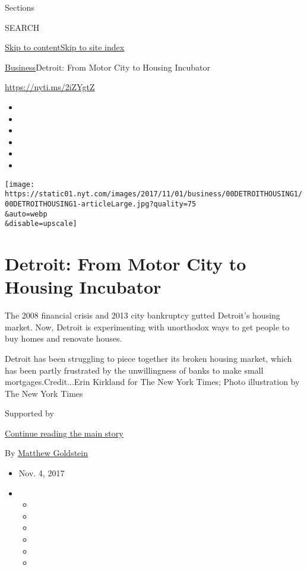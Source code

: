 Sections

SEARCH

\protect\hyperlink{site-content}{Skip to
content}\protect\hyperlink{site-index}{Skip to site index}

\href{/section/business}{Business}\textbar{}Detroit: From Motor City to
Housing Incubator

\url{https://nyti.ms/2iZYgtZ}

\begin{itemize}
\item
\item
\item
\item
\item
\item
\end{itemize}

\texttt{[image: https://static01.nyt.com/images/2017/11/01/business/00DETROITHOUSING1/00DETROITHOUSING1-articleLarge.jpg?quality=75\\\&auto=webp\\\&disable=upscale]}

\hypertarget{detroit-from-motor-city-to-housing-incubator}{%
\section{Detroit: From Motor City to Housing
Incubator}\label{detroit-from-motor-city-to-housing-incubator}}

The 2008 financial crisis and 2013 city bankruptcy gutted Detroit's
housing market. Now, Detroit is experimenting with unorthodox ways to
get people to buy homes and renovate houses.

Detroit has been struggling to piece together its broken housing market,
which has been partly frustrated by the unwillingness of banks to make
small mortgages.Credit...Erin Kirkland for The New York Times; Photo
illustration by The New York Times

Supported by

\protect\hyperlink{after-sponsor}{Continue reading the main story}

By \href{http://www.nytimes.com/by/matthew-goldstein}{Matthew Goldstein}

\begin{itemize}
\item
  Nov. 4, 2017
\item
  \begin{itemize}
  \item
  \item
  \item
  \item
  \item
  \item
  \end{itemize}
\end{itemize}

